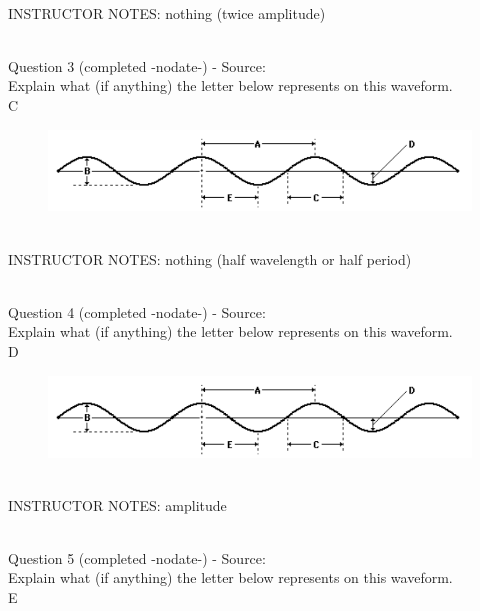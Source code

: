 \documentclass[12pt]{article}
\begin{document}
~\\
INSTRUCTOR NOTES: nothing (twice amplitude)


~\\

{\large Question 3} (completed -nodate-) - Source: \\

Explain what (if anything) the letter below represents on this waveform.\\

C

\begin{figure}[H]
\includegraphics{../images/sinusoid.png}
\end{figure}

~\\
INSTRUCTOR NOTES: nothing (half wavelength or half period)


~\\

{\large Question 4} (completed -nodate-) - Source: \\

Explain what (if anything) the letter below represents on this waveform.\\

D

\begin{figure}[H]
\includegraphics{../images/sinusoid.png}
\end{figure}

~\\
INSTRUCTOR NOTES: amplitude


~\\

{\large Question 5} (completed -nodate-) - Source: \\

Explain what (if anything) the letter below represents on this waveform.\\

E
\end{document}
